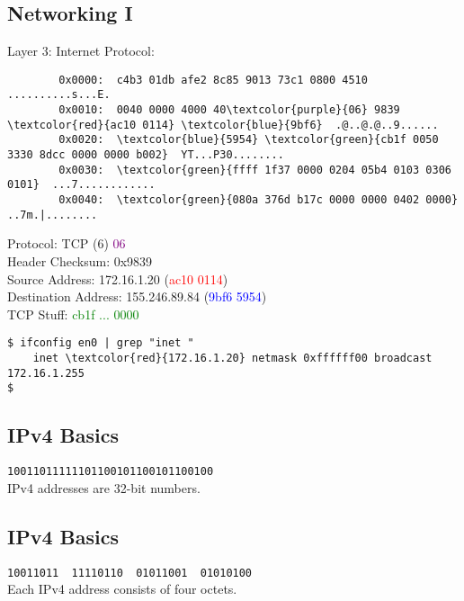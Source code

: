 \documentclass[xga]{xdvislides}
\begin{document}
\subsection{Networking I}
Layer 3: Internet Protocol: \\
\begin{Verbatim}
        0x0000:  c4b3 01db afe2 8c85 9013 73c1 0800 4510  ..........s...E.
        0x0010:  0040 0000 4000 40\textcolor{purple}{06} 9839 \textcolor{red}{ac10 0114} \textcolor{blue}{9bf6}  .@..@.@..9......
        0x0020:  \textcolor{blue}{5954} \textcolor{green}{cb1f 0050 3330 8dcc 0000 0000 b002}  YT...P30........
        0x0030:  \textcolor{green}{ffff 1f37 0000 0204 05b4 0103 0306 0101}  ...7............
        0x0040:  \textcolor{green}{080a 376d b17c 0000 0000 0402 0000}       ..7m.|........
\end{Verbatim}
Protocol: TCP (6) \textcolor{purple}{06} \\
Header Checksum: 0x9839 \\
Source Address: 172.16.1.20 (\textcolor{red}{ac10 0114}) \\
Destination Address: 155.246.89.84 (\textcolor{blue}{9bf6 5954}) \\
TCP Stuff: \textcolor{green}{cb1f ... 0000}

\vspace{.25in}
\begin{Verbatim}
$ ifconfig en0 | grep "inet "
	inet \textcolor{red}{172.16.1.20} netmask 0xffffff00 broadcast 172.16.1.255
$ 
\end{Verbatim}

\subsection{IPv4 Basics}
\vspace{.5in}
\Hugesize
\begin{center}
\verb|10011011111101100101100101100100| \\
\vspace{.5in}
IPv4 addresses are 32-bit numbers.
\end{center}
\Normalsize

\subsection{IPv4 Basics}
\vspace{.5in}
\Hugesize
\begin{center}
\verb|10011011  11110110  01011001  01010100| \\
\vspace{.5in}
Each IPv4 address consists of four octets.
\end{center}
\Normalsize
\end{document}
